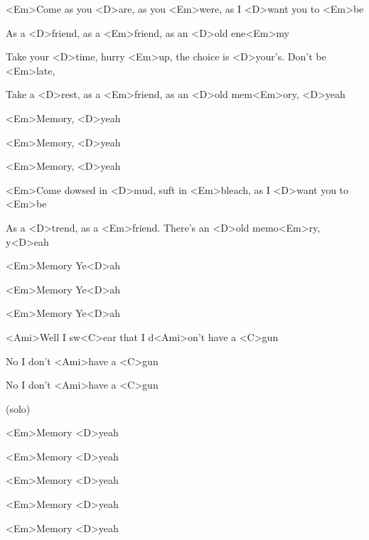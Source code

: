 

\zs
<Em>Come as you <D>are, as you <Em>were, as I <D>want you to <Em>be

As a <D>friend, as a <Em>friend, as an <D>old ene<Em>my
\ks

\zs
Take your <D>time, hurry <Em>up, the choice is <D>your's. Don't be <Em>late, 

Take a <D>rest, as a <Em>friend, as an <D>old mem<Em>ory, <D>yeah
\ks

\zr
<Em>Memory, <D>yeah

<Em>Memory, <D>yeah

<Em>Memory, <D>yeah
\kr

\zs
<Em>Come dowsed in <D>mud, suft in <Em>bleach, as I <D>want you to <Em>be

As a <D>trend, as a <Em>friend. There's an <D>old memo<Em>ry, y<D>eah
\ks

\zr
<Em>Memory Ye<D>ah 

<Em>Memory Ye<D>ah

<Em>Memory Ye<D>ah

<Ami>Well I sw<C>ear that I d<Ami>on't have a <C>gun

No I don't <Ami>have a <C>gun

No I don't <Ami>have a <C>gun
\kr

\zs
(solo)
\ks

\zr
<Em>Memory <D>yeah

<Em>Memory <D>yeah

<Em>Memory <D>yeah

<Em>Memory <D>yeah

<Em>Memory <D>yeah
\kr

\kp
